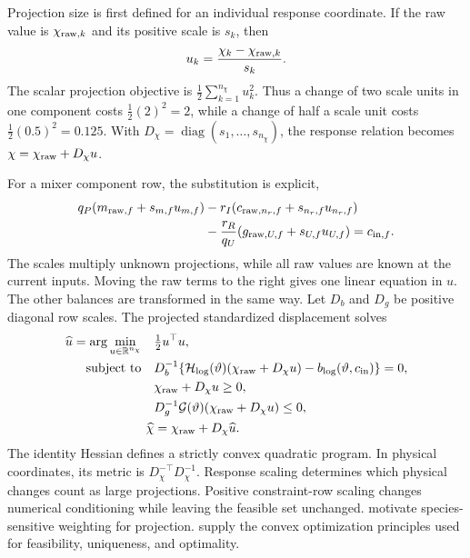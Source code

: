 Projection size is first defined for an individual response coordinate. If the raw value is $\chi_{{\rm raw},k}$ and its positive scale is $s_k$, then
\begin{equation}
\equationname{Standardized projection displacement of one response coordinate}
u_k=\frac{\chi_k-\chi_{{\rm raw},k}}{s_k}.
\end{equation}
The scalar projection objective is $\tfrac12\sum_{k=1}^{n_\chi}u_k^2$. Thus a change of two scale units in one component costs $\tfrac12(2)^2=2$, while a change of half a scale unit costs $\tfrac12(0.5)^2=0.125$. With $D_\chi=\operatorname{diag}(s_1,\ldots,s_{n_\chi})$, the response relation becomes $\chi=\chi_{\rm raw}+D_\chi u$.

For a mixer component row, the substitution is explicit,
\begin{align}
\equationname{Scaled mixer equation before the return-sludge term}
q_P(m_{{\rm raw},f}+s_{m,f}u_{m,f})
&-r_I(c_{{\rm raw},n_r,f}+s_{n_r,f}u_{n_r,f})\\
\equationname{Return-sludge term and target of the scaled mixer equation}
&-\frac{r_R}{q_U}(g_{{\rm raw},U,f}+s_{U,f}u_{U,f})
=c_{{\rm in},f}.
\end{align}
The scales multiply unknown projections, while all raw values are known at the current inputs. Moving the raw terms to the right gives one linear equation in $u$. The other balances are transformed in the same way. Let $D_b$ and $D_g$ be positive diagonal row scales. The projected standardized displacement solves
\begin{align}
\equationname{Minimum-distance objective for joint plant projection}
\widehat u=\arg\min_{u\in\mathbb R^{n_\chi}}\quad&\tfrac12u^\top u,\\
\text{subject to}\quad&
D_b^{-1}\{\mathcal H_{\log}(\vartheta)(\chi_{\rm raw}+D_\chi u)
-b_{\log}(\vartheta,c_{\rm in})\}=0,\notag\\
&\chi_{\rm raw}+D_\chi u\ge0,\notag\\
&D_g^{-1}\mathcal G(\vartheta)(\chi_{\rm raw}+D_\chi u)\le0,\notag\\
\equationname{Reconstruction of the projected physical plant response}
\widehat\chi&=\chi_{\rm raw}+D_\chi\widehat u.
\label{eq:plant_joint_projection}
\end{align}
The identity Hessian defines a strictly convex quadratic program. In physical coordinates, its metric is $D_\chi^{-\top}D_\chi^{-1}$. Response scaling determines which physical changes count as large projections. Positive constraint-row scaling changes numerical conditioning while leaving the feasible set unchanged. \citet{SturmSilva2024} motivate species-sensitive weighting for projection. \citet{Boyd2004} supply the convex optimization principles used for feasibility, uniqueness, and optimality.

